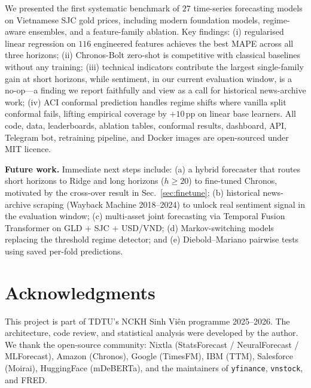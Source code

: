\documentclass[conference]{IEEEtran}
\begin{document}
We presented the first systematic benchmark of $27$ time-series forecasting models on Vietnamese SJC gold prices, including modern foundation models, regime-aware ensembles, and a feature-family ablation. Key findings: (i) regularised linear regression on $116$ engineered features achieves the best MAPE across all three horizons; (ii) Chronos-Bolt zero-shot is competitive with classical baselines without any training; (iii) technical indicators contribute the largest single-family gain at short horizons, while sentiment, in our current evaluation window, is a no-op---a finding we report faithfully and view as a call for historical news-archive work; (iv) ACI conformal prediction handles regime shifts where vanilla split conformal fails, lifting empirical coverage by $+10$\,pp on linear base learners. All code, data, leaderboards, ablation tables, conformal results, dashboard, API, Telegram bot, retraining pipeline, and Docker images are open-sourced under MIT licence.

\textbf{Future work.} Immediate next steps include: (a) a hybrid forecaster that routes short horizons to Ridge and long horizons ($h\geq 20$) to fine-tuned Chronos, motivated by the cross-over result in Sec.~\ref{sec:finetune}; (b) historical news-archive scraping (Wayback Machine 2018--2024) to unlock real sentiment signal in the evaluation window; (c) multi-asset joint forecasting via Temporal Fusion Transformer on GLD + SJC + USD/VND; (d) Markov-switching models replacing the threshold regime detector; and (e) Diebold--Mariano pairwise tests using saved per-fold predictions.

\section*{Acknowledgments}
This project is part of TDTU's NCKH Sinh Viên programme 2025--2026. The architecture, code review, and statistical analysis were developed by the author. We thank the open-source community: Nixtla (StatsForecast / NeuralForecast / MLForecast), Amazon (Chronos), Google (TimesFM), IBM (TTM), Salesforce (Moirai), HuggingFace (mDeBERTa), and the maintainers of \texttt{yfinance}, \texttt{vnstock}, and FRED.
\end{document}
